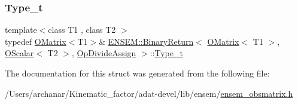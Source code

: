 \mbox{\label{structENSEM_1_1BinaryReturn_3_01OMatrix_3_01T1_01_4_00_01OScalar_3_01T2_01_4_00_01OpDivideAssign_01_4_a102ea2da5914e62170be58225f52a842}} 
\subsubsection{\texorpdfstring{Type\_t}{Type\_t}\hspace{0.1cm}{\footnotesize\ttfamily [3/3]}}
{\footnotesize\ttfamily template$<$class T1 , class T2 $>$ \\
typedef \mbox{\hyperlink{classENSEM_1_1OMatrix}{O\+Matrix}}$<$T1$>$\& \mbox{\hyperlink{structENSEM_1_1BinaryReturn}{E\+N\+S\+E\+M\+::\+Binary\+Return}}$<$ \mbox{\hyperlink{classENSEM_1_1OMatrix}{O\+Matrix}}$<$ T1 $>$, \mbox{\hyperlink{classENSEM_1_1OScalar}{O\+Scalar}}$<$ T2 $>$, \mbox{\hyperlink{structENSEM_1_1OpDivideAssign}{Op\+Divide\+Assign}} $>$\+::\mbox{\hyperlink{structENSEM_1_1BinaryReturn_3_01OMatrix_3_01T1_01_4_00_01OScalar_3_01T2_01_4_00_01OpDivideAssign_01_4_a102ea2da5914e62170be58225f52a842}{Type\+\_\+t}}}



The documentation for this struct was generated from the following file\+:\begin{DoxyCompactItemize}
\item 
/\+Users/archanar/\+Kinematic\+\_\+factor/adat-\/devel/lib/ensem/\mbox{\hyperlink{adat-devel_2lib_2ensem_2ensem__obsmatrix_8h}{ensem\+\_\+obsmatrix.\+h}}\end{DoxyCompactItemize}
